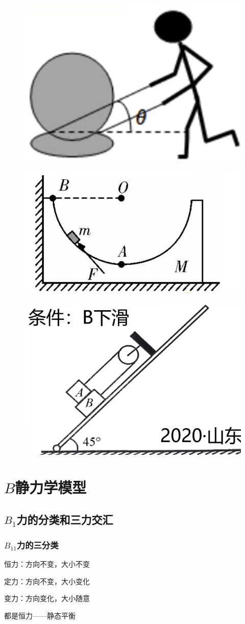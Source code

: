 \documentclass[lang=cn,10pt]{elegantbook}
\begin{document}
	\begin{example}
		\begin{figure}[H]
			\centering
			\includegraphics[width=0.3\linewidth]{image/18}
		\end{figure}
	\end{example}
	\begin{example}
		\begin{figure}[H]
			\centering
			\includegraphics[width=0.3\linewidth]{image/19}
		\end{figure}
	\end{example}
	\begin{example}
		\begin{figure}[H]
			\centering
			\includegraphics[width=0.25\linewidth]{image/20}
		\end{figure}
	\end{example}
	\section{$B$静力学模型}
	\subsection{$B_{1}$力的分类和三力交汇}
	\subsubsection{$B_{11}$力的三分类}
	
	恒力：方向不变，大小不变
	
	定力：方向不变，大小变化
	
	变力：方向变化，大小随意
	 
	
	都是恒力——静态平衡
	
\end{document}
